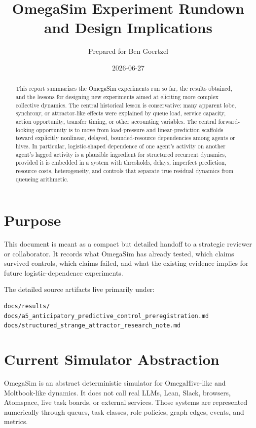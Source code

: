 \documentclass[11pt]{article}
\title{OmegaSim Experiment Rundown and Design Implications}
\author{Prepared for Ben Goertzel}
\date{2026-06-27}
\begin{document}
\maketitle

\begin{abstract}
This report summarizes the OmegaSim experiments run so far, the results
obtained, and the lessons for designing new experiments aimed at eliciting
more complex collective dynamics. The central historical lesson is
conservative: many apparent lobe, synchrony, or attractor-like effects were
explained by queue load, service capacity, action opportunity, transfer timing,
or other accounting variables. The central forward-looking opportunity is to
move from load-pressure and linear-prediction scaffolds toward explicitly
nonlinear, delayed, bounded-resource dependencies among agents or hives. In
particular, logistic-shaped dependence of one agent's activity on another
agent's lagged activity is a plausible ingredient for structured recurrent
dynamics, provided it is embedded in a system with thresholds, delays,
imperfect prediction, resource costs, heterogeneity, and controls that separate
true residual dynamics from queueing arithmetic.
\end{abstract}

\section{Purpose}

This document is meant as a compact but detailed handoff to a strategic
reviewer or collaborator. It records what OmegaSim has already tested, which
claims survived controls, which claims failed, and what the existing evidence
implies for future logistic-dependence experiments.

The detailed source artifacts live primarily under:

\begin{verbatim}
docs/results/
docs/a5_anticipatory_predictive_control_preregistration.md
docs/structured_strange_attractor_research_note.md
\end{verbatim}

\section{Current Simulator Abstraction}

OmegaSim is an abstract deterministic simulator for OmegaHive-like and
Moltbook-like dynamics. It does not call real LLMs, Lean, Slack, browsers,
Atomspace, live task boards, or external services. Those systems are
represented numerically through queues, task classes, role policies, graph
edges, events, and metrics.
\end{document}

